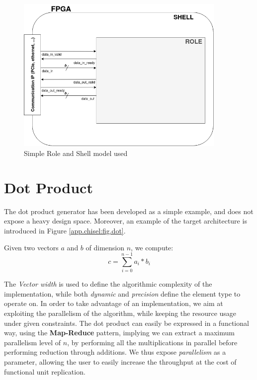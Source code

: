     \clearpage
        \begin{figure}[ht!]
            \centering
            \includegraphics[width=0.9\textwidth]{Figures/shell.png}
            \caption{Simple Role and Shell model used}
            \label{app.benchmark:sec.kernel:fig.model}
        \end{figure}
        \vspace{-1cm}

    \section*{Dot Product}
        The dot product generator has been developed as a simple example, and does not expose a heavy design space.
        Moreover, an example of the target architecture is introduced in Figure \ref{app.chisel:fig.dot}.

        Given two vectors $a$ and $b$ of dimension $n$, we compute:
        \begin{equation}
            \label{app.benchmark:sec.dp:eq.formula}
            c = \sum_{i=0}^{n-1}a_i*b_i
        \end{equation}

        
        The {\it Vector width} is used to define the algorithmic complexity of the implementation, while both {\it dynamic} and {\it precision} define the element type to operate on.
        In order to take advantage of an  implementation, we aim at exploiting the parallelism of the algorithm, while keeping the resource usage under given constraints.
        The dot product can easily be expressed in a functional way, using the {\bf Map-Reduce} pattern, implying we can extract a maximum parallelism level of $n$, by performing all the multiplications in parallel before performing reduction through additions.
        We thus expose {\it parallelism} as a parameter, allowing the user to easily increase the throughput at the cost of functional unit replication.

